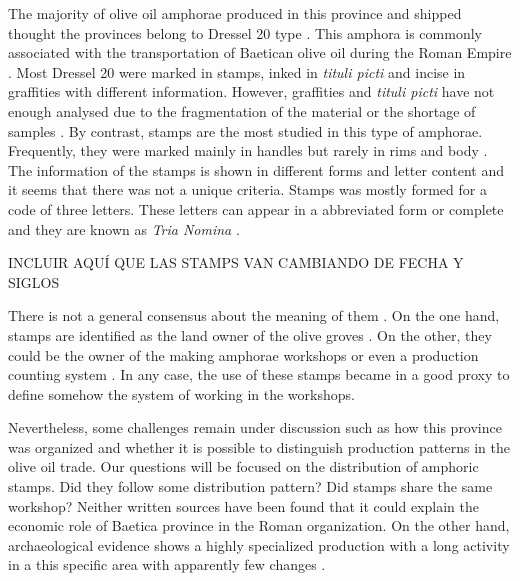 \documentclass[review]{elsarticle}
\begin{document}
The majority of olive oil amphorae produced in this province and shipped thought the provinces belong to Dressel 20 type \citep{dressel,martin-kilcher_romischen_1994}. This amphora is commonly associated with the transportation of Baetican olive oil during the Roman Empire \citep{berni_millet_epigrafianforica_2008}. Most Dressel 20 were marked in stamps, inked in \textit{tituli picti} and incise in graffities with different information. However, graffities and \textit{tituli picti} have not enough analysed due to the fragmentation of the material or the shortage of samples \citep{aguilera_evolucion_2007,rovira_guardiola_grafitos_2007}. By contrast, stamps are the most studied in this type of amphorae. Frequently, they were marked mainly in handles but rarely in rims and body \citep{millet_anforas_1998}. 
The information of the stamps is shown in different forms and letter content and it seems that there was not a unique criteria. Stamps was mostly formed for a code of three letters. These letters can appear in a abbreviated form or complete and they are known as \textit{Tria Nomina} \citep{berni_millet_amphora_1996}. 

INCLUIR AQUÍ QUE LAS STAMPS VAN CAMBIANDO DE FECHA Y SIGLOS

 There is not a general consensus about the meaning of them \citep{rodriguez_baetican_1998}. On the one hand, stamps are identified as the land owner of the olive groves \citep{rodriguez_economioleicola_1977}. On the other, they could be the owner of the making amphorae workshops or even a production counting system  \citep{berni_millet_epigrafianforica_2008}. In any case, the use of these stamps became in a good proxy to define somehow the system of working in the workshops. 

Nevertheless, some challenges remain under discussion such as how this province was organized and whether it is possible to distinguish production patterns in the olive oil trade. Our questions will be focused on the distribution of amphoric stamps. Did they follow some distribution pattern? Did stamps share the same workshop? Neither written sources have been found that it could explain the economic role of Baetica province in the Roman organization. On the other hand, archaeological evidence shows a highly specialized production with a long activity in a this specific area with apparently few changes \citep{remesal_anforas_2004}. 

\end{document}
